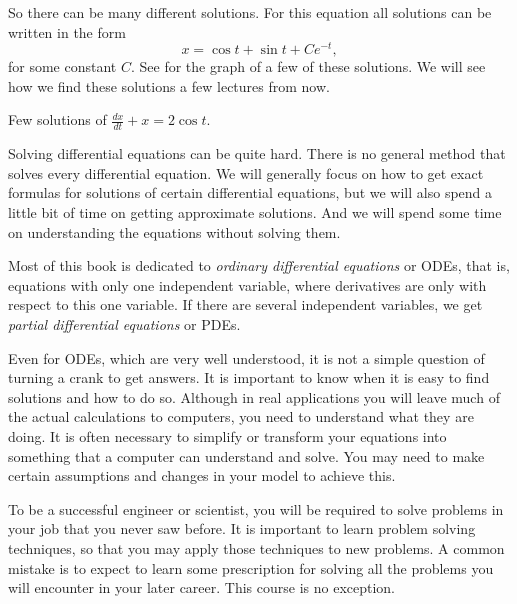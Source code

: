 So there can be many different solutions.  For this equation all
solutions can be written in the form
\begin{equation*}
x = \cos t + \sin t + C e^{-t} ,
\end{equation*}
for some constant $C$.  See  for the graph of a
few of these solutions. 
We will see how we find these solutions
a few lectures from now.

\begin{mywrapfig}{3.25in}
\capstart
{}
\caption{Few solutions of $\frac{dx}{dt} + x = 2 \cos t$.\label{intro:plotsfig}}
\end{mywrapfig}%

\medskip

Solving differential equations can be quite hard.  
There is no general method that solves every differential equation.  We will
generally focus on how to get exact formulas for solutions of certain
differential
equations, but we will also spend a little bit of time
on getting approximate solutions.
And we will spend some time on understanding the equations without solving
them.

Most of this book is dedicated to
\emph{ordinary differential equations}
or ODEs, that is, equations with
only one independent variable, where derivatives are only with respect to
this one variable.
If there are several independent variables, we get
\emph{partial differential equations}
or PDEs.

Even for ODEs, which are very well understood, it is not a simple question
of turning a crank to get answers.  
It is important to
know when it is easy to find solutions and how to do so.
Although in real applications you will
leave much of the actual calculations to computers, you
need to understand what they are doing.  It is often necessary
to simplify or transform your equations into something that a computer can
understand and solve.
You may need to make certain assumptions and changes in your
model to achieve this.

To be a successful engineer or scientist, you will be required to solve
problems in your job that you never saw before.  It is important to
learn problem solving techniques, so that you may apply those techniques to
new problems.  A common mistake is to expect to learn some prescription for
solving all the problems you will encounter in your later career.  This
course is no exception.



